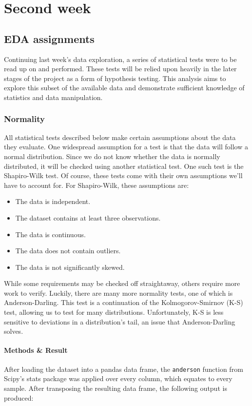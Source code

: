 \chapter{Second week}
\section{EDA assignments}
Continuing last week's data exploration, a series of statistical tests were to be read up on and performed.
These tests will be relied upon heavily in the later stages of the project as a form of hypothesis testing.
This analysis aims to explore this subset of the available data and demonstrate sufficient knowledge of statistics and data manipulation.

\subsection{Normality} \label{w2:normality}
All statistical tests described below make certain assumptions about the data they evaluate.
One widespread assumption for a test is that the data will follow a normal distribution.
Since we do not know whether the data is normally distributed, it will be checked using another statistical test.
One such test is the Shapiro-Wilk test.
Of course, these tests come with their own assumptions we'll have to account for.
For Shapiro-Wilk, these assumptions are:
\begin{itemize}
    \item The data is independent.
    \item The dataset contains at least three observations.
    \item The data is continuous.
    \item The data does not contain outliers.
    \item The data is not significantly skewed.
\end{itemize}
While some requirements may be checked off straightaway, others require more work to verify.
Luckily, there are many more normality tests, one of which is Anderson-Darling.
This test is a continuation of the Kolmogorov-Smirnov (K-S) test, allowing us to test for many distributions.
Unfortunately, K-S is less sensitive to deviations in a distribution's tail, an issue that Anderson-Darling solves.

\subsubsection{Methods \& Result}
After loading the dataset into a pandas data frame, the \verb|anderson| function from Scipy's stats package was applied over every column, which equates to every sample.
After transposing the resulting data frame, the following output is produced:


